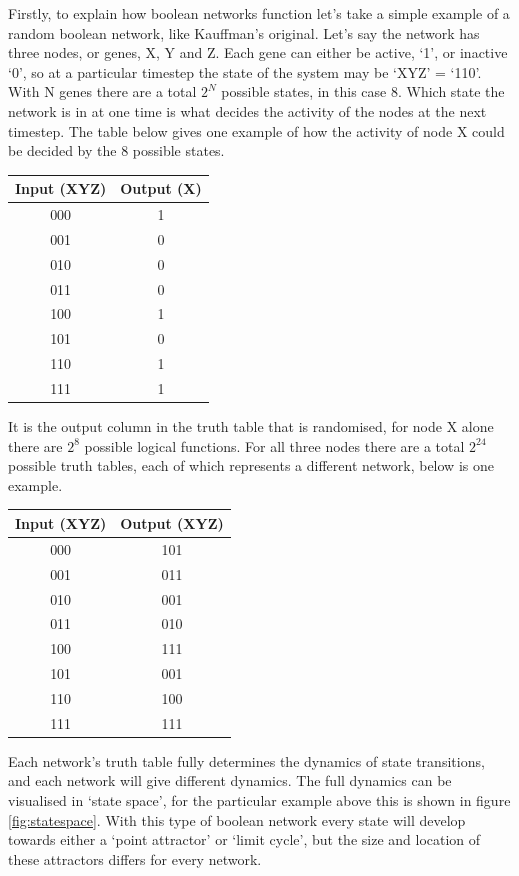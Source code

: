 \documentclass[a4paper,11pt]{article}
\begin{document}
Firstly, to explain how boolean networks function let's take a simple example of a random boolean network, like Kauffman's original. Let's say the network has three nodes, or genes, X, Y and Z. Each gene can either be active, `1', or inactive `0', so at a particular timestep the state of the system may be `XYZ' = `110'. With N genes there are a total $2^N$ possible states, in this case 8. Which state the network is in at one time is what decides the activity of the nodes at the next timestep. The table below gives one example of how the activity of node X could be decided by the 8 possible states.\par
\vspace{2em}
\begin{center}
  \begin{tabular}{| c | c |} 
    \hline
    Input (XYZ) & Output (X) \\ 
    \hline  
    000 & 1 \\
    001 & 0 \\
    010 & 0 \\
    011 & 0 \\
    100 & 1 \\
    101 & 0 \\
    110 & 1 \\
    111 & 1 \\
    \hline
  \end{tabular}
\end{center}
\vspace{2em}
It is the output column in the truth table that is randomised, for node X alone there are $2^8$ possible logical functions. For all three nodes there are a total $2^{24}$ possible truth tables, each of which represents a different network, below is one example.\par
\vspace{2em}
\begin{center}
  \begin{tabular}{| c | c |} 
    \hline
    Input (XYZ) & Output (XYZ) \\ 
    \hline  
    000 & 101 \\
    001 & 011 \\
    010 & 001 \\
    011 & 010 \\
    100 & 111 \\
    101 & 001 \\
    110 & 100 \\
    111 & 111 \\
    \hline
  \end{tabular}
\end{center}
\vspace{2em}
Each network's truth table fully determines the dynamics of state transitions, and each network will give different dynamics. The full dynamics can be visualised in `state space', for the particular example above this is shown in figure \ref{fig:statespace}. With this type of boolean network every state will develop towards either a `point attractor' or `limit cycle', but the size and location of these attractors differs for every network.\par 
\end{document}
